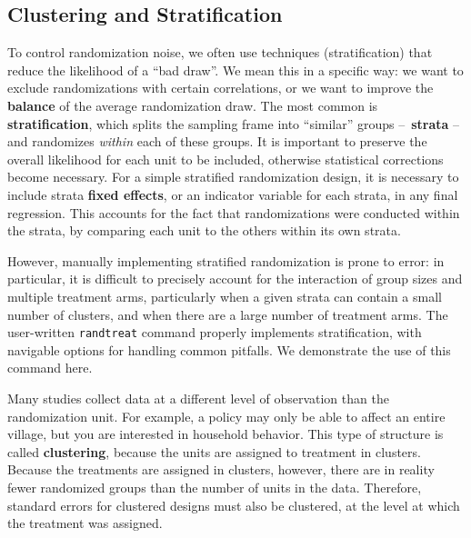 {
}

\subsection{Clustering and Stratification}

To control randomization noise, we often use techniques
\index(stratification)
that reduce the likelihood of a ``bad draw''.\cite{athey2017econometrics}
We mean this in a specific way: we want to exclude
randomizations with certain correlations,
or we want to improve the \textbf{balance}
of the average randomization draw.\cite{bruhn2009pursuit}
The most common is \textbf{stratification},
which splits the sampling frame into ``similar'' groups – \textbf{strata} –
and randomizes \textit{within} each of these groups.
It is important to preserve the overall likelihood for each unit to be included,
otherwise statistical corrections become necessary.
For a simple stratified randomization design,
it is necessary to include strata \textbf{fixed effects},
or an indicator variable for each strata, in any final regression.
This accounts for the fact that randomizations were conducted within the strata,
by comparing each unit to the others within its own strata.

However, manually implementing stratified randomization
is prone to error: in particular, it is difficult to precisely account
for the interaction of group sizes and multiple treatment arms,
particularly when a given strata can contain a small number of clusters,
and when there are a large number of treatment arms.\cite{carril2017dealing}
The user-written \texttt{randtreat} command
properly implements stratification,
with navigable options for handling common pitfalls.
We demonstrate the use of this command here.

{
}

Many studies collect data at a different level of observation than the randomization unit.
For example, a policy may only be able to affect an entire village,
but you are interested in household behavior.
This type of structure is called \textbf{clustering},
because the units are assigned to treatment in clusters.
Because the treatments are assigned in clusters, however,
there are in reality fewer randomized groups than the number of units in the data.
Therefore, standard errors for clustered designs must also be clustered,
at the level at which the treatment was assigned.

